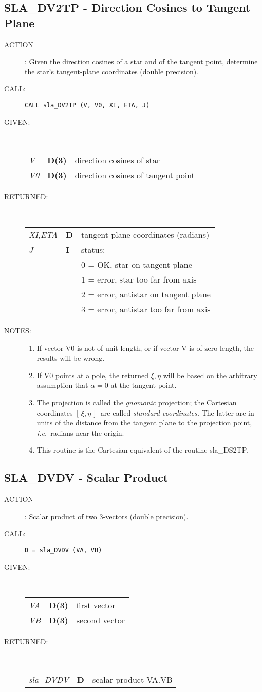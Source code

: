 \documentclass[11pt,twoside]{article}
\newcommand{\xlabel}[1]{}
\newcommand{\xieta}     {$[\,\xi,\eta\,]$}
\newcommand{\routine}[3]
{\hbadness=10000
  \vbox
  {
    \rule{\textwidth}{0.3mm}\\
    {\Large {\bf #1} \hfill #2 \hfill {\bf #1}}\\
    \setlength{\oldspacing}{\topsep}
    \setlength{\topsep}{0.3ex}
    \begin{description}
      #3
    \end{description}
    \setlength{\topsep}{\oldspacing}
  }
}
\renewcommand{\routine}[3]
   {
      \subsection{#1\xlabel{#1} - #2\label{#1}}
       \begin{description}
         #3
       \end{description}
   }
\newcommand{\action}[1]
{\item[ACTION]: #1}
\newcommand{\action}[1]
   {\item[ACTION:] #1}
\newcommand{\call}[1]
{\item[CALL]: \hspace{0.4em}{\tt #1}}
\newlength{\oldspacing}
\renewcommand{\call}[1]
   {
    \item[CALL:] {\tt #1}
   }
\newcommand{\args}[2]
{
  \goodbreak
  \setlength{\oldspacing}{\topsep}
  \setlength{\topsep}{0.3ex}
  \begin{description}
  \item[#1]:\\[1.5ex]
    \begin{tabular}{p{7em}p{6em}p{22em}}
      #2
    \end{tabular}
  \end{description}
  \setlength{\topsep}{\oldspacing}
}
\renewcommand{\args}[2]
   {
     \begin{description}
        \item[#1:]\\
        \begin{tabular}{p{7em}p{6em}l}
           #2
        \end{tabular}
     \end{description}
   }
\newcommand{\spec}[3]
{
  {\em {#1}} & {\bf \mbox{#2}} & {#3}
}
\newcommand{\notes}[1]
{
  \goodbreak
  \setlength{\oldspacing}{\topsep}
  \setlength{\topsep}{0.3ex}
  \begin{description}
    \item[NOTES]:
        #1
  \end{description}
  \setlength{\topsep}{\oldspacing}
}
\renewcommand{\notes}[1]
   {
      \begin{description}
         \item[NOTES:]
            #1
      \end{description}
   }
\begin{document}
\routine{SLA\_DV2TP}{Direction Cosines to Tangent Plane}
{
 \action{Given the direction cosines of a star and of the tangent point,
         determine the star's tangent-plane coordinates
         (double precision).}
 \call{CALL sla\_DV2TP (V, V0, XI, ETA, J)}
}
\args{GIVEN}
{
 \spec{V}{D(3)}{direction cosines of star} \\
 \spec{V0}{D(3)}{direction cosines of tangent point}
}
\args{RETURNED}
{
 \spec{XI,ETA}{D}{tangent plane coordinates (radians)} \\
 \spec{J}{I}{status:} \\
 \spec{}{}{\hspace{1.5em} 0 = OK, star on tangent plane} \\
 \spec{}{}{\hspace{1.5em} 1 = error, star too far from axis} \\
 \spec{}{}{\hspace{1.5em} 2 = error, antistar on tangent plane} \\
 \spec{}{}{\hspace{1.5em} 3 = error, antistar too far from axis}
}
\notes
{
 \begin{enumerate}
  \item If vector V0 is not of unit length, or if vector V is of zero
        length, the results will be wrong.
  \item If V0 points at a pole, the returned $\xi,\eta$
        will be based on the
        arbitrary assumption that $\alpha=0$ at the tangent point.
  \item The projection is called the {\it gnomonic}\/ projection;  the
        Cartesian coordinates \xieta\ are called 
        {\it standard coordinates.}\/  The latter
        are in units of the distance from the tangent plane to the projection
        point, {\it i.e.}\ radians near the origin.
  \item This routine is the Cartesian equivalent of the routine sla\_DS2TP.
 \end{enumerate}
}
\routine{SLA\_DVDV}{Scalar Product}
{
 \action{Scalar product of two 3-vectors (double precision).}
 \call{D~=~sla\_DVDV (VA, VB)}
}
\args{GIVEN}
{
 \spec{VA}{D(3)}{first vector} \\
 \spec{VB}{D(3)}{second vector}
}
\args{RETURNED}
{
 \spec{sla\_DVDV}{D}{scalar product VA.VB}
}
\end{document}

